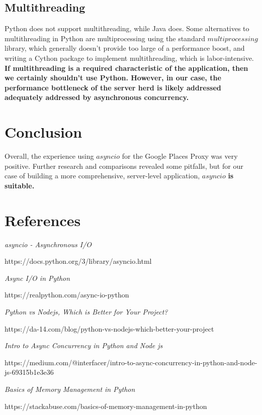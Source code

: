 \subsection{Multithreading}
Python does not support multithreading, while Java does. Some alternatives to multithreading in Python are multiprocessing using the standard
$multiprocessing$ library, which generally doesn't provide too large of a performance boost, and writing a Cython package to implement multithreading, which
is labor-intensive. \textbf{If multithreading is a required characteristic of the application, then we certainly shouldn't use Python. However, in our case, the performance 
bottleneck of the server herd is likely addressed adequately addressed by asynchronous concurrency.}
\section{Conclusion}
Overall, the experience using $asyncio$ for the Google Places Proxy was very positive. Further research and comparisons revealed some pitfalls, 
but for our case of building a more comprehensive, server-level application, $asyncio$ \textbf{is suitable.}

\section{References}
\noindent [1] \emph{asyncio - Asynchronous I/O}

\noindent https://docs.python.org/3/library/asyncio.html

\noindent [2] \emph{Async I/O in Python} 

\noindent https://realpython.com/async-io-python

\noindent [3] \emph{Python vs Nodejs, Which is Better for Your Project?} 

\noindent https://da-14.com/blog/python-vs-nodejs-which-better-your-project

\noindent [4] \emph{Intro to Async Concurrency in Python and Node js} 

\noindent https://medium.com/@interfacer/intro-to-async-concurrency-in-python-and-node-js-69315b1e3e36

\noindent [5] \emph{Basics of Memory Management in Python} 

\noindent https://stackabuse.com/basics-of-memory-management-in-python




